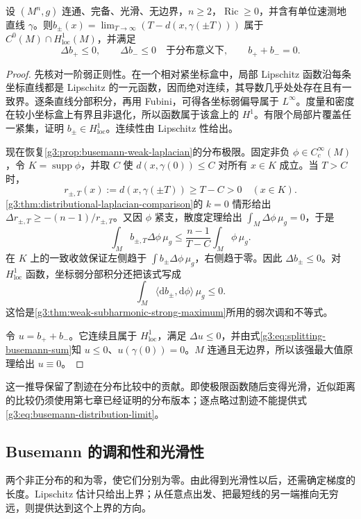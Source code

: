 \begin{proposition}\label{g3:prop:line-busemann-opposites}
	设 \((M^n,g)\) 连通、完备、光滑、无边界，\(n\ge2\)，\(\operatorname{Ric}\ge0\)，并含有单位速测地直线 \(\gamma\)。则\(b_\pm(x)=\lim_{T\to\infty}(T-d(x,\gamma(\pm T)))\) 属于 \(C^0(M)\cap H^1_{\mathrm{loc}}(M)\)，并满足
	\[
		\Delta b_+\le0,\qquad \Delta b_-\le0
		\quad\text{于分布意义下},\qquad b_++b_-=0.
	\]
\end{proposition}
\begin{proof}
	先核对一阶弱正则性。在一个相对紧坐标盒中，局部 Lipschitz 函数沿每条坐标直线都是 Lipschitz 的一元函数，因而绝对连续，其导数几乎处处存在且有一致界。逐条直线分部积分，再用 Fubini，可得各坐标弱偏导属于 \(L^\infty\)。度量和密度在较小坐标盒上有界且非退化，所以函数属于该盒上的 \(H^1\)。有限个局部片覆盖任一紧集，证明 \(b_\pm\in H^1_{\mathrm{loc}}\)。连续性由 Lipschitz 性给出。

	现在恢复\cref{g3:prop:busemann-weak-laplacian}的分布极限。固定非负 \(\phi\in C_c^\infty(M)\)，令 \(K=\operatorname{supp}\phi\)，并取 \(C\) 使 \(d(x,\gamma(0))\le C\) 对所有 \(x\in K\) 成立。当 \(T>C\) 时，
	\[
		r_{\pm,T}(x):=d(x,\gamma(\pm T))\ge T-C>0
		\quad(x\in K).
	\]
	\cref{g3:thm:distributional-laplacian-comparison}的 \(k=0\) 情形给出
	\(\Delta r_{\pm,T}\ge-(n-1)/r_{\pm,T}\)。又因 \(\phi\) 紧支，散度定理给出 \(\int_M\Delta\phi\,\mu_g=0\)，于是
	\begin{equation}\label{g3:eq:busemann-distribution-limit}
		\int_M b_{\pm,T}\Delta\phi\,\mu_g
		\le\frac{n-1}{T-C}\int_M\phi\,\mu_g.
	\end{equation}
	在 \(K\) 上的一致收敛保证左侧趋于 \(\int b_\pm\Delta\phi\,\mu_g\)，右侧趋于零。因此 \(\Delta b_\pm\le0\)。对 \(H^1_{\mathrm{loc}}\) 函数，坐标弱分部积分还把该式写成
	\[
		\int_M\langle\mathrm db_\pm,\mathrm d\phi\rangle\,\mu_g\le0.
	\]
	这恰是\cref{g3:thm:weak-subharmonic-strong-maximum}所用的弱次调和不等式。

	令 \(u=b_++b_-\)。它连续且属于 \(H^1_{\mathrm{loc}}\)，满足 \(\Delta u\le0\)，并由式\eqref{g3:eq:splitting-busemann-sum}知 \(u\le0\)、\(u(\gamma(0))=0\)。\(M\) 连通且无边界，所以该强最大值原理给出 \(u\equiv0\)。
\end{proof}

这一推导保留了割迹在分布比较中的贡献。即使极限函数随后变得光滑，近似距离的比较仍须使用第七章已经证明的分布版本；逐点略过割迹不能提供式\eqref{g3:eq:busemann-distribution-limit}。

\subsection{Busemann 的调和性和光滑性}
\label{g3:subsec:1505:03}
两个非正分布的和为零，使它们分别为零。由此得到光滑性以后，还需确定梯度的长度。Lipschitz 估计只给出上界；从任意点出发、把最短线的另一端推向无穷远，则提供达到这个上界的方向。

